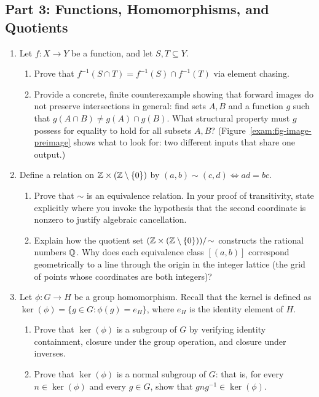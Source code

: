 \subsection{Part 3: Functions, Homomorphisms, and Quotients}

\begin{enumerate}[resume]
  \item Let $f: X \to Y$ be a function, and let $S, T \subseteq Y$.
  \begin{enumerate}
    \item Prove that $f^{-1}(S \cap T) = f^{-1}(S) \cap f^{-1}(T)$ via element chasing.
    \item Provide a concrete, finite counterexample showing that forward images do not preserve intersections in general: find sets $A, B$ and a function $g$ such that $g(A \cap B) \neq g(A) \cap g(B)$. What structural property must $g$ possess for equality to hold for all subsets $A, B$? (Figure~\ref{exam:fig-image-preimage} shows what to look for: two different inputs that share one output.)
  \end{enumerate}
  \item Define a relation on $\mathbb{Z} \times (\mathbb{Z} \setminus \{0\})$ by $(a, b) \sim (c, d) \iff ad = bc$.
  \begin{enumerate}
    \item Prove that $\sim$ is an equivalence relation. In your proof of transitivity, state explicitly where you invoke the hypothesis that the second coordinate is nonzero to justify algebraic cancellation.
    \item Explain how the quotient set $(\mathbb{Z} \times (\mathbb{Z} \setminus \{0\}))/\!\sim$ constructs the rational numbers $\mathbb{Q}$. Why does each equivalence class $[(a, b)]$ correspond geometrically to a line through the origin in the integer lattice (the grid of points whose coordinates are both integers)?
  \end{enumerate}
  \item Let $\phi: G \to H$ be a group homomorphism. Recall that the kernel is defined as $\ker(\phi) = \{g \in G : \phi(g) = e_H\}$, where $e_H$ is the identity element of $H$.
  \begin{enumerate}
    \item Prove that $\ker(\phi)$ is a subgroup of $G$ by verifying identity containment, closure under the group operation, and closure under inverses.
    \item Prove that $\ker(\phi)$ is a normal subgroup of $G$: that is, for every $n \in \ker(\phi)$ and every $g \in G$, show that $gng^{-1} \in \ker(\phi)$.
  \end{enumerate}
\end{enumerate}

